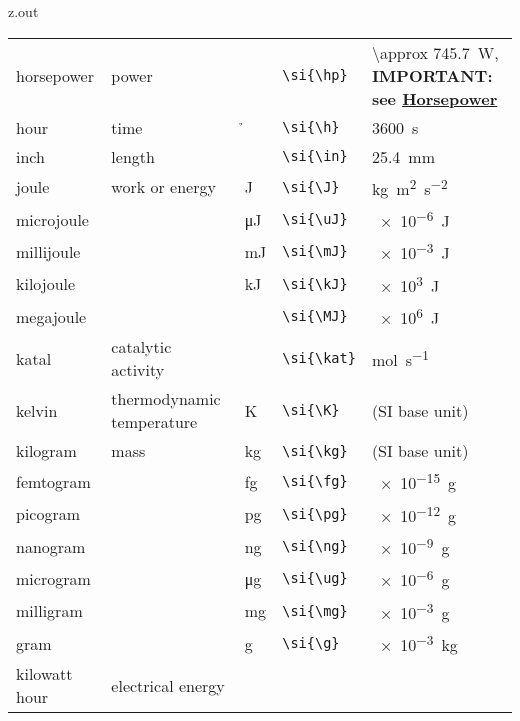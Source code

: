 \begin{VerbatimOut}{z.out}
{\begin{longtable}{@{}P{1.4in}P{1in}llP{1.8in}@{}}
    \vsp
    horsepower&
      power&
      \si{\hp}&
      \verb+\si{\hp}+&
      \SI{\approx 745.7}{\W}, {\bfseries IMPORTANT:\newline
        see \href{https://en.wikipedia.org/wiki/Horsepower#Mechanical_horsepower}{Horsepower}}\\
    \vsp
    hour&
      time&
      \si{\h}&
      \verb+\si{\h}+&
      \SI{3600}{\s}\\
    \vsp
    inch&
      length&
      \si{\in}&
      \verb+\si{\in}+&
      \SI{25.4}{\mm}\\  %
    \vsp
    joule&
      work or energy&
      \si{\J}&
      \verb+\si{\J}+&
      \si{\kg\m\squared\per\s\squared}\\
    \quad microjoule&
      \ditto&
      \si{\uJ}&
      \verb+\si{\uJ}+&
      \SI{e-6}{\J}\\
    \quad millijoule&
      \ditto&
      \si{\mJ}&
      \verb+\si{\mJ}+&
      \SI{e-3}{\J}\\
    \quad kilojoule&
      \ditto&
      \si{\kJ}&
      \verb+\si{\kJ}+&
      \SI{e3}{\J}\\
    \quad megajoule&
      \ditto&
      \si{\MJ}&
      \verb+\si{\MJ}+&
      \SI{e6}{\J}\\
    \vsp
    katal&
      catalytic activity&
      \si{\kat}&
      \verb+\si{\kat}+&
      \si{\mol\per\s}\\
    \vsp
    kelvin&
      thermodynamic temperature&
      \si{\K}&
      \verb+\si{\K}+&
      (SI base unit)\\
    \vsp
    kilogram&
      mass&
      \si{\kg}&
      \verb+\si{\kg}+&
      (SI base unit)\\
    \quad femtogram&
      \ditto&
      \si{\fg}&
      \verb+\si{\fg}+&
      \SI{e-15}{\g}\\
    \quad picogram&
      \ditto&
      \si{\pg}&
      \verb+\si{\pg}+&
      \SI{e-12}{\g}\\
    \quad nanogram&
      \ditto&
      \si{\ng}&
      \verb+\si{\ng}+&
      \SI{e-9}{\g}\\
    \quad microgram&
      \ditto&
      \si{\ug}&
      \verb+\si{\ug}+&
      \SI{e-6}{\g}\\
    \quad milligram&
      \ditto&
      \si{\mg}&
      \verb+\si{\mg}+&
      \SI{e-3}{\g}\\
    \quad gram&
      \ditto&
      \si{\g}&
      \verb+\si{\g}+&
      \SI{e-3}{\kg}\\
    \vsp
    kilowatt hour&
      electrical energy&

\end{longtable}}
\end{VerbatimOut}
